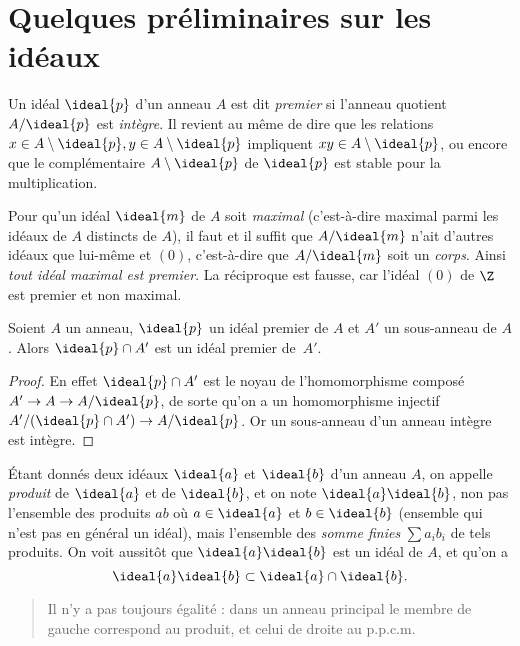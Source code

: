 \documentclass[11pt, %
  title in boldface,
  theorem in new line,
  theorem numbering = section,
  number theorems separately,
  simple name,
]{beaulivre}
\begin{document}
\section{Quelques préliminaires sur les idéaux}\label{sec:quelques préliminaires sur les idéaux}

    Un idéal \( \ideal{p} \) d'un anneau \( A \) est dit \emph{premier} si l'anneau quotient \( A/\ideal{p} \) est \emph{intègre}. Il revient au même de dire que les relations \( x \in A \setminus \ideal{p}, y \in A \setminus \ideal{p} \) impliquent \( xy \in A \setminus \ideal{p} \), ou encore que le complémentaire \( A \setminus \ideal{p} \) de \( \ideal{p} \) est stable pour la multiplication.

    Pour qu'un idéal \( \ideal{m} \) de \( A \) soit \emph{maximal} (c'est-à-dire maximal parmi les idéaux de \( A \) distincts de \( A \)), il faut et il suffit que \( A/\ideal{m} \) n'ait d'autres idéaux que lui-même et \( (0) \), c'est-à-dire que \( A/\ideal{m} \) soit un \emph{corps}. Ainsi \emph{tout idéal maximal est premier}. La réciproque est fausse, car l'idéal \( (0) \) de \( \Z \) est premier et non maximal.

    \begin{lemma}\label{lem:intersection d'un idéal premier et un sous-anneau est un idéal premier}
        Soient \( A \) un anneau, \( \ideal{p} \) un idéal premier de \( A \) et \( A' \) un sous-anneau de \( A \). Alors \( \ideal{p} \cap A' \) est un idéal premier de~\( A' \).
    \end{lemma}
    \begin{proof}
        En effet \( \ideal{p} \cap A' \) est le noyau de l'homomorphisme composé \( A' \to A \to A/\ideal{p} \), de sorte qu'on a un homomorphisme injectif \( A'/(\ideal{p} \cap A') \to A/\ideal{p} \). Or un sous-anneau d'un anneau intègre est intègre.
    \end{proof}

    Étant donnés deux idéaux \( \ideal{a} \) et \( \ideal{b} \) d'un anneau \( A \), on appelle \emph{produit} de \( \ideal{a} \) et de \( \ideal{b} \), et on note \( \ideal{a}\ideal{b} \), non pas l'ensemble des produits \( ab \) où \( a \in \ideal{a} \) et \( b \in \ideal{b} \) (ensemble qui n'est pas en général un idéal), mais l'ensemble des \emph{somme finies} \( \sum a_i b_i \) de tels produits. On voit aussitôt que \( \ideal{a}\ideal{b} \) est un idéal de \( A \), et qu'on a
    \begin{equation}
        \ideal{a}\ideal{b} \subset \ideal{a} \cap \ideal{b}.
    \end{equation}
    \begin{quote}
        Il n'y a pas toujours égalité : dans un anneau principal le membre de gauche correspond au produit, et celui de droite au p.p.c.m.
    \end{quote}
\end{document}
